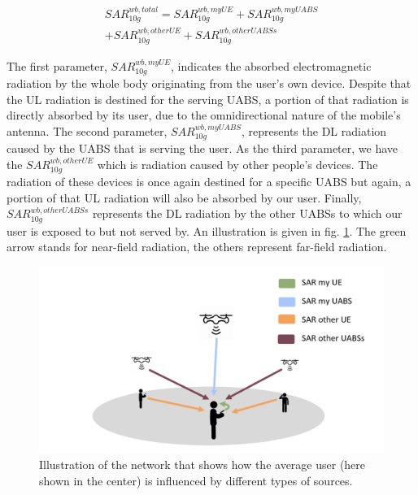 \documentclass[twocolumn]{phdsymp} %
\begin{document}
\begin{equation} 
\begin{aligned}
SAR^{wb,total}_{10g} = SAR^{wb,myUE}_{10g} +  SAR^{wb,myUABS}_{10g} \\
+ SAR^{wb,otherUE}_{10g} + SAR^{wb,otherUABSs}_{10g}
\end{aligned}
\label{eq:overallSARwb}
\end{equation}

The first parameter, $SAR^{wb,myUE}_{10g}$, indicates the absorbed electromagnetic radiation by the whole body originating from the user's own device. Despite that the 
\gls{UL} radiation is destined for the serving \gls{UABS}, a portion of that radiation is directly absorbed by its user, due to the omnidirectional nature of the mobile's antenna.
The second parameter, $SAR^{wb,myUABS}_{10g}$, represents the \gls{DL} radiation caused by the \gls{UABS} that is serving the user.
As the third parameter, we have the $SAR^{wb,otherUE}_{10g}$ which is radiation caused by other people's devices. The radiation of these devices is once again 
destined for a specific \gls{UABS} but again, a portion of that \gls{UL} radiation will also be absorbed by our user.
Finally, $SAR^{wb,otherUABSs}_{10g}$ represents the \gls{DL} radiation by the other \gls{UABS}s to which our user is exposed to but not served by.
An illustration is given in fig. \ref{fig:networkIllustration}.
The green arrow stands for near-field radiation, the others represent far-field radiation.

\begin{figure}[h!]
\centering
  \includegraphics[width=\linewidth]{networkIllustrationSARSources.png}
  \caption{Illustration of the network that shows how the average user (here shown in the center) is influenced by different types of sources. }
  \label{fig:networkIllustration}
\end{figure}
\end{document}
